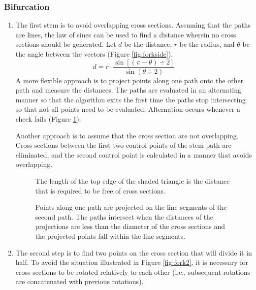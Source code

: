 \documentclass[10pt]{article}
\begin{document}
\subsubsection{Bifurcation}
\begin{enumerate}
\item The first stem is to avoid overlapping cross sections. Assuming that the paths are lines, the law of sines can be used to find a distance wherein no cross sections should be generated. Let $ d $ be the distance, $ r $ be the radius, and $ \theta $ be the angle between the vectors (Figure \ref{fig:forkside}).
\[ d = r \cdot \frac{\sin[(\pi-\theta)\div2]}{\sin (\theta\div2)} \]
A more flexible approach is to project points along one path onto the other path and measure the distances. The paths are evaluated in an alternating manner so that the algorithm exits the first time the paths stop intersecting so that not all points need to be evaluated. Alternation occurs whenever a check fails (Figure \ref{fig:path}).

Another approach is to assume that the cross section are not overlapping. Cross sections between the first two control points of the stem path are eliminated, and the second control point is calculated in a manner that avoids overlapping.

\begin{figure}[h]
 \begin{minipage}[b]{0.46\textwidth}
  \centering
  
  \caption{The length of the top edge of the shaded triangle is the distance that is required to be free of cross sections.} \label{fig:forkside}
 \end{minipage}
 \hfill
 \begin{minipage}[b]{0.46\textwidth}
  \centering
  
  \caption{Points along one path are projected on the line segments of the second path. The paths intersect when the distances of the projections are less than the diameter of the cross sections and the projected points fall within the line segments.} \label{fig:path}
 \end{minipage}
\end{figure}

\item The second step is to find two points on the cross section that will divide it in half. To avoid the situation illustrated in Figure \ref{fig:fork2}, it is necessary for cross sections to be rotated relatively to each other (i.e., subsequent rotations are concatenated with previous rotations).


\end{enumerate}
\end{document}
